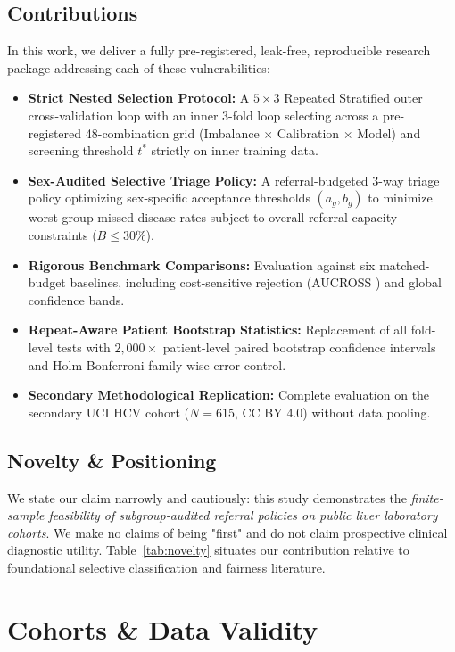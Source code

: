 \documentclass[11pt,a4paper]{article}
\begin{document}
\subsection{Contributions}
In this work, we deliver a fully pre-registered, leak-free, reproducible research package addressing each of these vulnerabilities:
\begin{itemize}
    \item \textbf{Strict Nested Selection Protocol:} A $5\times 3$ Repeated Stratified outer cross-validation loop with an inner 3-fold loop selecting across a pre-registered 48-combination grid (Imbalance $\times$ Calibration $\times$ Model) and screening threshold $t^*$ strictly on inner training data.
    \item \textbf{Sex-Audited Selective Triage Policy:} A referral-budgeted 3-way triage policy optimizing sex-specific acceptance thresholds $(a_g, b_g)$ to minimize worst-group missed-disease rates subject to overall referral capacity constraints ($B \le 30\%$).
    \item \textbf{Rigorous Benchmark Comparisons:} Evaluation against six matched-budget baselines, including cost-sensitive rejection (AUCROSS \cite{pugnana2023auc}) and global confidence bands.
    \item \textbf{Repeat-Aware Patient Bootstrap Statistics:} Replacement of all fold-level tests with $2,000\times$ patient-level paired bootstrap confidence intervals and Holm-Bonferroni family-wise error control.
    \item \textbf{Secondary Methodological Replication:} Complete evaluation on the secondary UCI HCV cohort ($N=615$, CC BY 4.0) without data pooling.
\end{itemize}

\subsection{Novelty \& Positioning}
We state our claim narrowly and cautiously: this study demonstrates the \textit{finite-sample feasibility of subgroup-audited referral policies on public liver laboratory cohorts}. We make no claims of being "first" and do not claim prospective clinical diagnostic utility. Table~\ref{tab:novelty} situates our contribution relative to foundational selective classification and fairness literature.



\section{Cohorts \& Data Validity}
\end{document}
